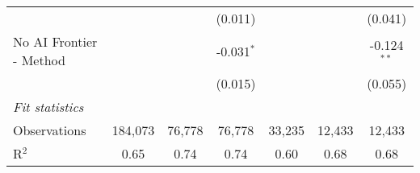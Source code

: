 \begin{tabular}{lcccccc}
                           &                &               & (0.011)       &                &                & (0.041)\\   
   No AI Frontier - Method &                &               & -0.031$^{*}$  &                &                & -0.124$^{**}$\\   
                           &                &               & (0.015)       &                &                & (0.055)\\   
   \midrule
   \emph{Fit statistics}\\
   Observations            & 184,073        & 76,778        & 76,778        & 33,235         & 12,433         & 12,433\\  
   R$^2$                   & 0.65           & 0.74          & 0.74          & 0.60           & 0.68           & 0.68\\  
   

\end{tabular}
